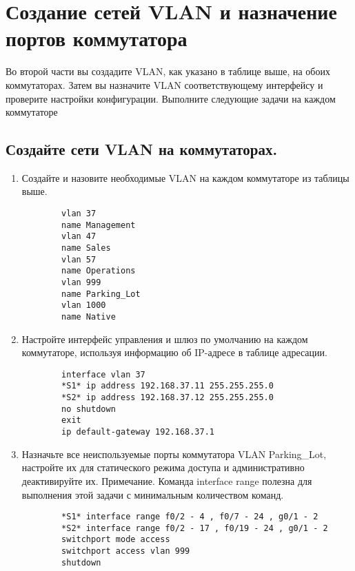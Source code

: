 \section{Создание сетей VLAN и назначение портов коммутатора}
Во второй части вы создадите VLAN, как указано в таблице выше, на обоих коммутаторах.
Затем вы назначите VLAN соответствующему интерфейсу и проверите настройки конфигурации.
Выполните следующие задачи на каждом коммутаторе

\subsection{Создайте сети VLAN на коммутаторах.}
\begin{enumerate}[a]
    \item Создайте и назовите необходимые VLAN на каждом коммутаторе из таблицы выше.
    \begin{verbatim}
        vlan 37
        name Management
        vlan 47
        name Sales
        vlan 57
        name Operations
        vlan 999
        name Parking_Lot
        vlan 1000
        name Native
    \end{verbatim}

    \item Настройте интерфейс управления и шлюз по умолчанию на каждом коммутаторе, используя
    информацию об IP-адресе в таблице адресации.
    \begin{verbatim}
        interface vlan 37
        *S1* ip address 192.168.37.11 255.255.255.0
        *S2* ip address 192.168.37.12 255.255.255.0
        no shutdown
        exit
        ip default-gateway 192.168.37.1
    \end{verbatim}

    \item Назначьте все неиспользуемые порты коммутатора VLAN Parking\_Lot, настройте их для
    статического режима доступа и административно деактивируйте их.
    Примечание.
    Команда interface range полезна для выполнения этой задачи с минимальным
    количеством команд.
    \begin{verbatim}
        *S1* interface range f0/2 - 4 , f0/7 - 24 , g0/1 - 2
        *S2* interface range f0/2 - 17 , f0/19 - 24 , g0/1 - 2
        switchport mode access
        switchport access vlan 999
        shutdown
    \end{verbatim}
\end{enumerate}

